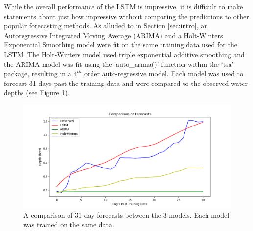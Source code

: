While the overall performance of the LSTM is impressive, it is difficult to make statements about just how impressive without comparing the predictions to other popular forecasting methods. As alluded to in Section \ref{sec:intro}, an Autoregressive Integrated Moving Average (ARIMA) and a Holt-Winters Exponential Smoothing model were fit on the same training data used for the LSTM. The Holt-Winters model used triple exponential additive smoothing and the ARIMA model was fit using the `auto\_arima()' function within the `tsa' package, resulting in a $4^{th}$ order auto-regressive model. Each model was used to forecast 31 days past the training data and were compared to the observed water depths (see Figure \ref{fig:Comparison}).

\begin{figure}[ht]
    \centering
    \includegraphics[width=1\linewidth]{"Figures/LSTM_ARIMA_HW.png"}
    \caption{A comparison of 31 day forecasts between the 3 models. Each model was trained on the same data.}
    \label{fig:Comparison}
\end{figure}